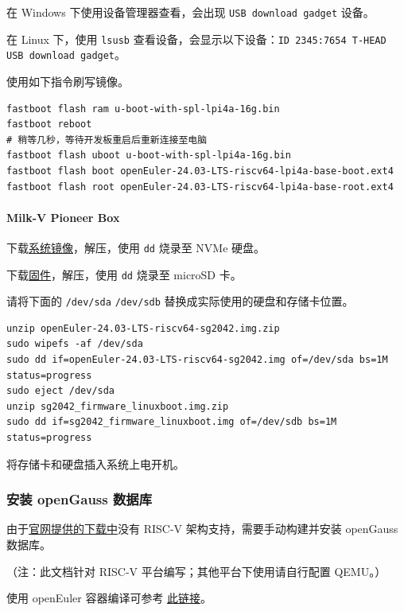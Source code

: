 \documentclass{article}
\begin{document}
在 Windows 下使用设备管理器查看，会出现 \verb|USB download gadget| 设备。

在 Linux 下，使用 \verb|lsusb| 查看设备，会显示以下设备：\verb|ID 2345:7654 T-HEAD USB download gadget|。

使用如下指令刷写镜像。

\begin{verbatim}
fastboot flash ram u-boot-with-spl-lpi4a-16g.bin
fastboot reboot
# 稍等几秒，等待开发板重启后重新连接至电脑
fastboot flash uboot u-boot-with-spl-lpi4a-16g.bin
fastboot flash boot openEuler-24.03-LTS-riscv64-lpi4a-base-boot.ext4
fastboot flash root openEuler-24.03-LTS-riscv64-lpi4a-base-root.ext4
\end{verbatim}

\paragraph{Milk-V Pioneer Box}
下载\href{https://mirrors.hust.edu.cn/openeuler/openEuler-24.03-LTS/embedded_img/riscv64/SG2042/openEuler-24.03-LTS-riscv64-sg2042.img.zip}{系统镜像}，解压，使用 \verb|dd| 烧录至 NVMe 硬盘。

下载\href{https://mirrors.hust.edu.cn/openeuler/openEuler-24.03-LTS/embedded_img/riscv64/SG2042/sg2042_firmware_linuxboot.img.zip}{固件}，解压，使用 \verb|dd| 烧录至 microSD 卡。

请将下面的 \verb|/dev/sda| \verb|/dev/sdb| 替换成实际使用的硬盘和存储卡位置。

\begin{verbatim}
unzip openEuler-24.03-LTS-riscv64-sg2042.img.zip
sudo wipefs -af /dev/sda
sudo dd if=openEuler-24.03-LTS-riscv64-sg2042.img of=/dev/sda bs=1M status=progress
sudo eject /dev/sda
unzip sg2042_firmware_linuxboot.img.zip
sudo dd if=sg2042_firmware_linuxboot.img of=/dev/sdb bs=1M status=progress
\end{verbatim}
将存储卡和硬盘插入系统上电开机。

\subsubsection{安装 openGauss 数据库}

由于\href{https://opengauss.org/zh/download/}{官网提供的下载中}没有 RISC-V 架构支持，需要手动构建并安装 openGauss 数据库。

（注：此文档针对 RISC-V 平台编写；其他平台下使用请自行配置 QEMU。）

使用 openEuler 容器编译可参考 \href{https://github.com/QA-Team-lo/dbtest/blob/main/opengauss/install.md}{此链接}。
\end{document}
